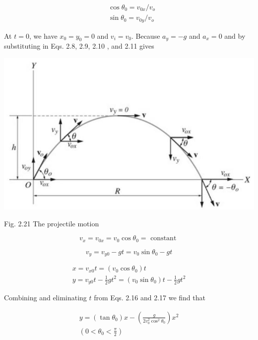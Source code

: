 \documentclass[10pt]{article}
\begin{document}
$$
\begin{aligned}
& \cos \theta_{0}=v_{0 x} / v_{o} \\
& \sin \theta_{0}=v_{0 y} / v_{o}
\end{aligned}
$$

At $t=0$, we have $x_{0}=y_{0}=0$ and $v_{i}=v_{0}$. Because $a_{y}=-g$ and $a_{x}=0$ and by substituting in Eqs. 2.8, 2.9, 2.10 , and 2.11 gives

\begin{center}
\includegraphics[max width=\textwidth]{2024_09_13_db1f357d2aad0a03eb2eg-038}
\end{center}

Fig. 2.21 The projectile motion


\begin{equation*}
v_{x}=v_{0 x}=v_{0} \cos \theta_{0}=\text { constant } \tag{2.14}
\end{equation*}



\begin{equation*}
v_{y}=v_{y 0}-g t=v_{0} \sin \theta_{0}-g t \tag{2.15}
\end{equation*}



\begin{gather*}
x=v_{x 0} t=\left(v_{0} \cos \theta_{0}\right) t  \tag{2.16}\\
y=v_{y 0} t-\frac{1}{2} g t^{2}=\left(v_{0} \sin \theta_{0}\right) t-\frac{1}{2} g t^{2} \tag{2.17}
\end{gather*}


Combining and eliminating $t$ from Eqs. 2.16 and 2.17 we find that

$$
\begin{gathered}
y=\left(\tan \theta_{0}\right) x-\left(\frac{g}{2 v_{0}^{2} \cos ^{2} \theta_{0}}\right) x^{2} \\
\left(0<\theta_{0}<\frac{\pi}{2}\right)
\end{gathered}
$$
\end{document}
